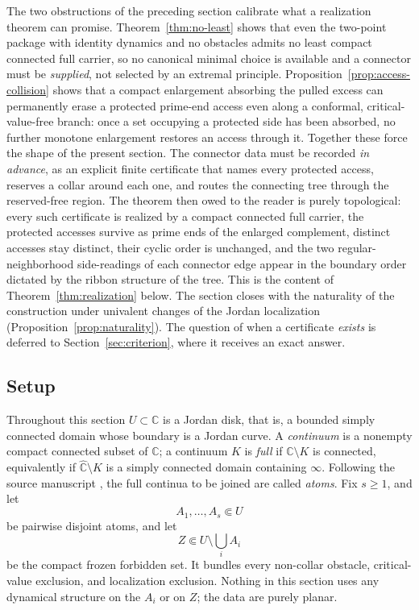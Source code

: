 \documentclass[11pt,reqno]{amsart}
\theoremstyle{definition}
\theoremstyle{remark}
\newcommand{\C}{\mathbb C}
\newcommand{\Chat}{\widehat{\mathbb C}}
\begin{document}
The two obstructions of the preceding section calibrate what a realization
theorem can promise.  Theorem~\ref{thm:no-least} shows that even the
two-point package with identity dynamics and no obstacles admits no least
compact connected full carrier, so no canonical minimal choice is available
and a connector must be \emph{supplied}, not selected by an extremal
principle.  Proposition~\ref{prop:access-collision} shows that a compact
enlargement absorbing the pulled excess can permanently erase a protected prime-end
access even along a conformal, critical-value-free branch: once a set
occupying a protected side has been absorbed, no further monotone
enlargement restores an access through it.  Together these force the shape
of the present section.  The connector data must be recorded \emph{in
advance}, as an explicit finite certificate that names every protected
access, reserves a collar around each one, and routes the connecting tree
through the reserved-free region.  The theorem then owed to the reader is
purely topological: every such certificate is realized by a compact
connected full carrier, the protected accesses survive as prime ends of the
enlarged complement, distinct accesses stay distinct, their cyclic order is
unchanged, and the two regular-neighborhood side-readings of each connector
edge appear in the boundary order dictated by the ribbon structure of the
tree.  This is the
content of Theorem~\ref{thm:realization} below.  The section closes with
the naturality of the construction under univalent changes of the Jordan
localization (Proposition~\ref{prop:naturality}).  The question of when a
certificate \emph{exists} is deferred to
Section~\ref{sec:criterion}, where it receives an exact answer.

\subsection*{Setup}
Throughout this section $U\subset\C$ is a Jordan disk, that is, a bounded
simply connected domain whose boundary is a Jordan curve.  A
\emph{continuum} is a nonempty compact connected subset of $\C$; a
continuum $K$ is \emph{full} if $\C\setminus K$ is connected, equivalently
if $\Chat\setminus K$ is a simply connected domain containing $\infty$.
Following the source manuscript \cite{MWman}, the full continua to be
joined are called \emph{atoms}.  Fix $s\ge1$, and let
\[
A_1,\dots,A_s\Subset U
\]
be pairwise disjoint atoms, and let
\[
Z\Subset U\setminus\bigcup_{i}A_i
\]
be the compact frozen forbidden set.  It bundles every non-collar
obstacle, critical-value exclusion, and localization exclusion.  Nothing
in this section uses any dynamical structure
on the $A_i$ or on $Z$; the data are purely planar.
\end{document}
